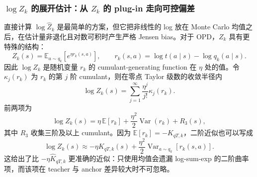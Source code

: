 \documentclass[lang=cn,scheme=chinese,openany]{../book/elegantbook}
\begin{document}
\subsubsection*{$\log Z_k$ 的展开估计：从 $Z_k$ 的 plug-in 走向可控偏差}
直接计算 $\log\widehat Z_k$ 是最简单的方案，但它把非线性的 log 放在 Monte Carlo 均值之后，在估计量非退化且对数可积时产生严格 Jensen bias。对于 OPD，$Z_k$ 具有更特殊的结构：
\begin{equation}
Z_k(s)=\mathbb E_{a\sim q_k}\left[e^{\eta r_k(s,a)}\right],
\qquad
r_k(s,a)=\log t(a\mid s)-\log q_k(a\mid s).
\label{eq:ch2-opd-z-cumulant-start}
\end{equation}
因此 $\log Z_k$ 是随机变量 $r_k$ 的 cumulant-generating function 在 $\eta$ 处的值。令 $\kappa_j(r_k)$ 为 $r_k$ 的第 $j$ 阶 cumulant，则在零点 Taylor 级数的收敛半径内
\begin{equation}
\log Z_k(s)=\sum_{j=1}^{\infty}\frac{\eta^j}{j!}\kappa_j(r_k).
\label{eq:ch2-opd-logz-cumulant-series}
\end{equation}
前两项为
\begin{equation}
\log Z_k(s)=\eta\,\mathbb E[r_k]
 +\frac{\eta^2}{2}\operatorname{Var}(r_k)
 +R_3(s),
\label{eq:ch2-opd-logz-second-order}
\end{equation}
其中 $R_3$ 收集三阶及以上 cumulant。因为 $\mathbb E[r_k]=-K_{qT,k}$，二阶近似也可以写成
\begin{equation}
\log Z_k(s)\approx-\eta K_{qT,k}(s)
 +\frac{\eta^2}{2}\operatorname{Var}_{a\sim q_k}[r_k(s,a)].
\label{eq:ch2-opd-logz-kl-expansion}
\end{equation}
这给出了比 $-\eta\widehat K_{qT,k}$ 更准确的近似：只使用均值会遗漏 log-sum-exp 的二阶曲率项，而该项在 teacher 与 anchor 差异较大时不可忽略。
\end{document}
